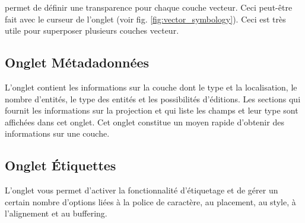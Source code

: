  \label{sec:vect_transparency} 
\qg \CURRENT permet de définir une transparence pour chaque couche vecteur. Ceci peut-être fait avec le curseur  de l'onglet  (voir fig. \ref{fig:vector_symbology}). Ceci est très utile pour superposer plusieurs couches vecteur.

\subsection{Onglet Métadadonnées}

L'onglet  contient les informations sur la couche dont le type et la localisation, le nombre d'entités, le type des entités et les possibilités d'éditions. Les sections  qui fournit les informations sur la projection et  qui liste les champs et leur type sont affichées dans cet onglet. Cet onglet constitue un moyen rapide d'obtenir des informations sur une couche.

\subsection{Onglet Étiquettes}

L'onglet  vous permet d'activer la fonctionnalité d'étiquetage et de gérer un certain nombre d'options liées à la police de caractère, au placement, au style, à l'alignement et au buffering.

